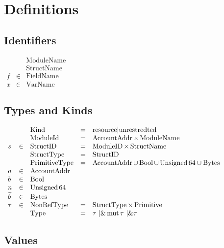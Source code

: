 \documentclass{article}
\newcommand{\tmop}[1]{\ensuremath{\operatorname{#1}}}
\newcommand{\tmstrong}[1]{\textbf{#1}}
\begin{document}
\section{Definitions}

\subsection{Identifiers}

$\begin{array}{lll}
  &  & \tmop{ModuleName}\\
  &  & \tmop{StructName}\\
  f & \in & \tmop{FieldName}\\
  x & \in & \tmop{VarName}
\end{array}$

\subsection{Types and Kinds}

$\begin{array}{lllll}
  &  & \tmop{Kind} & = & \tmstrong{\tmop{resource}} |
  \tmstrong{\tmop{unrestredted}}\\
  &  & \tmop{ModuleId} & = & \tmop{AccountAddr} \times \tmop{ModuleName}\\
  s & \in & \tmop{StructID} & = & \tmop{ModuleID} \times \tmop{StructName}\\
  &  & \tmop{StructType} & = & \tmop{StructID}\\
  &  & \tmop{PrimitiveType} & = & \tmop{AccountAddr} \cup \tmop{Bool} \cup
  \tmop{Unsigned} 64 \cup \tmop{Bytes}\\
  a & \in & \tmop{AccountAddr} &  & \\
  b & \in & \tmop{Bool} &  & \\
  n & \in & \tmop{Unsigned} 64 &  & \\
  \vec{b} & \in & \tmop{Bytes} &  & \\
  \tau & \in & \tmop{NonRefType} & = & \tmop{StructType} \times
  \tmop{Primitive}\\
  &  & \tmop{Type} & = & \text{$\tau$ \textbar $\&\tmop{mut} \tau$ \textbar
  $\&\tau$ }
\end{array}$

\subsection{Values}
\end{document}
